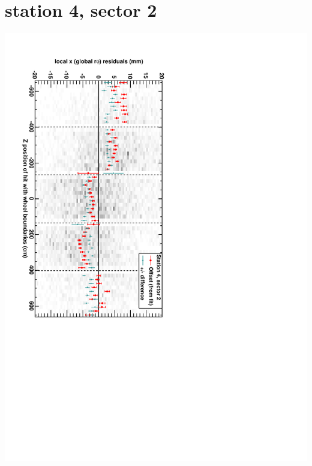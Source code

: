 \documentclass[compress]{beamer}
\begin{document}
\section*{station 4, sector 2}
\begin{frame} \vfill \mbox{\hspace{-1 cm}\includegraphics[height=1.2\linewidth, angle=90]{DTrphiVsZ_st4_sr02.pdf}} \end{frame}
\end{document}

